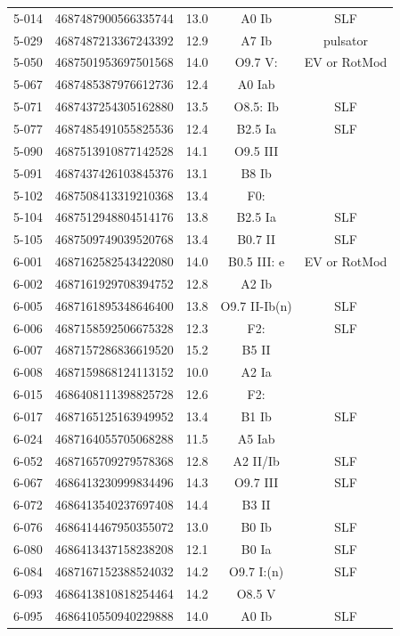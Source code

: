 \documentclass[fleqn,usenatbib]{mnras}
\begin{document}
\begin{longtable}{ccccc}
5-014 & 4687487900566335744 & 13.0 & A0 Ib & SLF\\ 
5-029 & 4687487213367243392 & 12.9 & A7 Ib & pulsator\\ 
5-050 & 4687501953697501568 & 14.0 & O9.7 V: & EV or RotMod\\ 
5-067 & 4687485387976612736 & 12.4 & A0 Iab & \\ 
5-071 & 4687437254305162880 & 13.5 & O8.5: Ib & SLF\\ 
5-077 & 4687485491055825536 & 12.4 & B2.5 Ia & SLF\\ 
5-090 & 4687513910877142528 & 14.1 & O9.5 III & \\ 
5-091 & 4687437426103845376 & 13.1 & B8 Ib & \\ 
5-102 & 4687508413319210368 & 13.4 & F0: & \\ 
5-104 & 4687512948804514176 & 13.8 & B2.5 Ia & SLF\\ 
5-105 & 4687509749039520768 & 13.4 & B0.7 II & SLF\\ 
6-001 & 4687162582543422080 & 14.0 & B0.5 III: e & EV or RotMod\\ 
6-002 & 4687161929708394752 & 12.8 & A2 Ib & \\ 
6-005 & 4687161895348646400 & 13.8 & O9.7 II-Ib(n) & SLF \\ 
6-006 & 4687158592506675328 & 12.3 & F2: & SLF\\ 
6-007 & 4687157286836619520 & 15.2 & B5 II & \\ 
6-008 & 4687159868124113152 & 10.0 & A2 Ia & \\ 
6-015 & 4686408111398825728 & 12.6 & F2: & \\ 
6-017 & 4687165125163949952 & 13.4 & B1 Ib & SLF\\ 
6-024 & 4687164055705068288 & 11.5 & A5 Iab & \\ 
6-052 & 4687165709279578368 & 12.8 & A2 II/Ib & SLF \\ 
6-067 & 4686413230999834496 & 14.3 & O9.7 III & SLF\\ 
6-072 & 4686413540237697408 & 14.4 & B3 II & \\ 
6-076 & 4686414467950355072 & 13.0 & B0 Ib & SLF\\ 
6-080 & 4686413437158238208 & 12.1 & B0 Ia & SLF\\ 
6-084 & 4687167152388524032 & 14.2 & O9.7 I:(n) & SLF\\ 
6-093 & 4686413810818254464 & 14.2 & O8.5 V & \\ 
6-095 & 4686410550940229888 & 14.0 & A0 Ib & SLF\\ 

\end{longtable}
\end{document}
